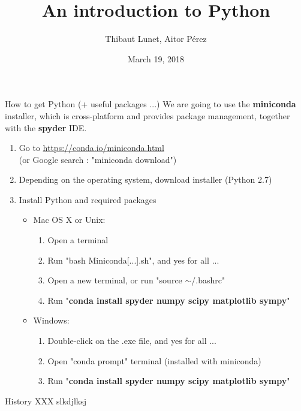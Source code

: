 \documentclass[11pt,unknownkeysallowed,usenames,dvipsnames]{beamer}
\title{An introduction to Python}
\author{Thibaut Lunet, Aitor Pérez}
\date{March 19, 2018}
\begin{document}
	\maketitle
	
   	\begin{frame}{How to get Python (+ useful packages ...)}
        We are going to use the \textbf{miniconda} installer, which is cross-platform and provides package management, together with the \textbf{spyder} IDE.
        
        \begin{enumerate}
            \item Go to \href{https://conda.io/miniconda.html}{https://conda.io/miniconda.html} \\ (or Google search : "miniconda download")
            \item Depending on the operating system, download installer (Python 2.7)
            \item Install Python and required packages
            \begin{itemize}
                \item Mac OS X or Unix:
                \begin{enumerate}
                    \item Open a terminal
                    \item Run "bash Miniconda[...].sh", and yes for all ...
                    \item Open a new terminal, or run "source $\sim$/.bashrc"
                    \item Run "\textbf{conda install spyder numpy scipy matplotlib sympy}"
                \end{enumerate}
                \item Windows:
                \begin{enumerate}
                    \item Double-click on the .exe file, and yes for all ...
                    \item Open "conda prompt" terminal (installed with miniconda)
                    \item Run "\textbf{conda install spyder numpy scipy matplotlib sympy}"
                \end{enumerate}
            \end{itemize}
        \end{enumerate}
    \end{frame}
    
	\begin{frame}{History}
		XXX slkdjlksj
	\end{frame}
\end{document}
